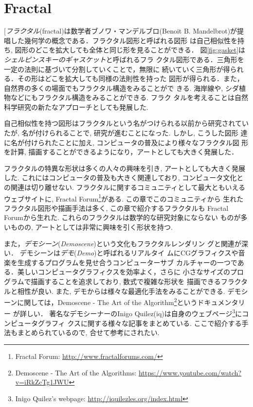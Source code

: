 
\section{Fractal}

[\emph{フラクタル}(fractal)は数学者ブノワ・マンデルブロ(Benoit
B. Mandelbrot)が提唱した幾何学の概念である．フラクタル図形と呼ばれる図形
は自己相似性を持ち, 図形のどこを拡大しても全体と同じ形を見ることができる．
図\ref{fig:gasket}は\emph{シェルピンスキーのギャスケット}と呼ばれるフラ
クタル図形である．三角形を一定の法則に基づいて分割していくことで，無限に
続いていく三角形が得られる．その形はどこを拡大しても同様の法則性を持った
図形が得られる．また，自然界の多くの場面でもフラクタル構造をみることがで
きる. 海岸線や, シダ植物などにもフラクタル構造をみることができる. フラク
タルを考えることは自然科学研究の新たなアプローチとしても発展した.

自己相似性を持つ図形はフラクタルという名がつけられる以前から研究されてい
たが, 名が付けられることで, 研究が進むことになった. しかし, こうした図形
達に名が付けられたことに加え, コンピュータの普及により様々なフラクタル図
形を計算, 描画することができるようになり，アートとしても大きく発展した．

フラクタルの特異な形状は多くの人々の興味を引き, アートとしても大きく発展
した. これにはコンピュータの普及も大きく関連しており, コンピュータ文化と
の関連は切り離せない. フラクタルに関するコミュニティとして最大ともいえる
ウェブサイトに, Fractal Forum\footnote{Fractal Forum:
\url{http://www.fractalforums.com/}}がある. この章でこのコミュニティから
生れたフラクタル図形や描画手法は多く, この章で紹介するフラクタルも
Fractal Forumから生れた. これらのフラクタルは数学的な研究対象にならない
ものが多いものの, アートとしては非常に興味を引く形状を持つ.

また，\emph{デモシーン}({\it Demoscene})という文化もフラクタルレンダリン
グと関連が深い．
デモシーンは\emph{デモ}({\it Demo})と呼ばれるリアルタイ
ムにCGグラフィクスや音楽を生成するプログラムを見せ合うコンピューターサブ
カルチャーの一つである．美しいコンピュータグラフィクスを効率よく，さらに
小さなサイズのプログラムで描画することを追求しており, 数式で複雑な形状を
描画できるフラクタルと相性が良い.
また, デモからは様々な最適化手法をみることができる.
 デモシーンに関しては，Demoscene - The
 Art of the Algorithm\footnote{Demoscene - The Art of the Algorithms:
 \url{https://www.youtube.com/watch?v=iRkZcTg1JWU}}というドキュメンタリー
 が詳しい．
著名なデモシーナーのInigo Quilez(iq)は自身のウェブページ\footnote{Inigo
Quilez's webpage: \url{http://iquilezles.org/index.html}}にコンピュータグラフィ
 クスに関する様々な記事をまとめている.
 ここで紹介する手法もまとめられているので, 合せて参考にされたい.

